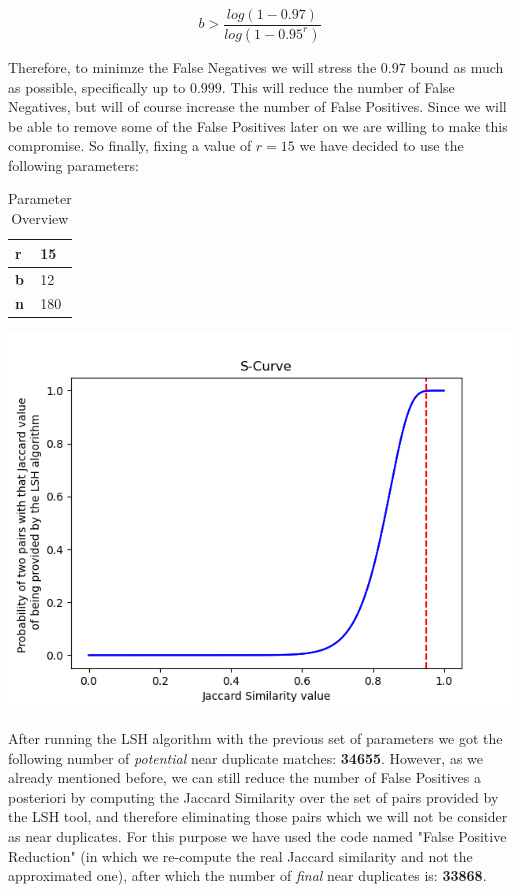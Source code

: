 \documentclass[10pt]{article}
\begin{document}
\begin{equation}
b > \frac{log(1-0.97)}{log(1-0.95^r)}
\end{equation}

Therefore, to minimze the False Negatives we will stress the $0.97$ bound as much as possible, specifically up to $0.999$. This will reduce the number of False Negatives, but will of course increase the number of False Positives. Since we will be able to remove some of the False Positives later on we are willing to make this compromise. So finally, fixing a value of $r=15$ we have decided to use the following parameters:

\begin{table}[H]
\centering
\begin{tabular}{|l|l|}
\hline
\textbf{r} & 15    \\ \hline
\textbf{b} & 12   \\ \hline
\textbf{n} & 180 \\ \hline
\end{tabular}
\caption{Parameter Overview}
\label{tab:my-table}
\end{table}

\begin{center}
\includegraphics[scale=.70]{Splot.png}
\end{center}

After running the LSH algorithm with the previous set of parameters we got the following number of \textit{potential} near duplicate matches: \textbf{34655}. However, as we already mentioned before, we can still reduce the number of False Positives a posteriori by computing the Jaccard Similarity over the set of pairs provided by the LSH tool, and therefore eliminating those pairs which we will not be consider as near duplicates. For this purpose we have used the code named "False Positive Reduction" (in which we re-compute the real Jaccard similarity and not the approximated one), after which the number of \textit{final} near duplicates is: \textbf{33868}.
\end{document}
